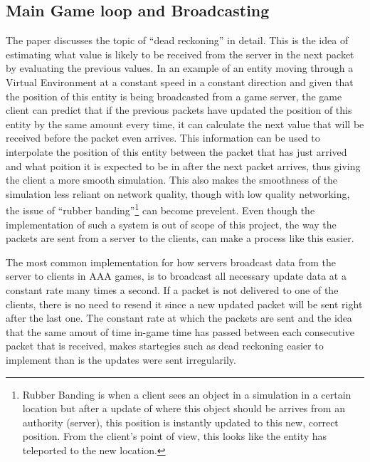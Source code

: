 \subsection{Main Game loop and Broadcasting}
The paper  discusses the topic of ``dead reckoning'' in detail. This is the idea of estimating what value is likely to be received from the server in the next packet by evaluating the previous values. In an example of an entity moving through a Virtual Environment at a constant speed in a constant direction and given that the position of this entity is being broadcasted from a game server, the game client can predict that if the previous packets have updated the position of this entity by the same amount every time, it can calculate the next value that will be received before the packet even arrives. This information can be used to interpolate the position of this entity between the packet that has just arrived and what poition it is expected to be in after the next packet arrives, thus giving the client a more smooth simulation. This also makes the smoothness of the simulation less reliant on network quality, though with low quality networking, the issue of ``rubber banding''\footnote{Rubber Banding is when a client sees an object in a simulation in a certain location but after a update of where this object should be arrives from an authority (server), this position is instantly updated to this new, correct position. From the client's point of view, this looks like the entity has teleported to the new location.} can become prevelent. Even though the implementation of such a system is out of scope of this project, the way the packets are sent from a server to the clients, can make a process like this easier.

The most common implementation for how servers broadcast data from the server to clients in AAA games, is to broadcast all necessary update data at a constant rate many times a second. If a packet is not delivered to one of the clients, there is no need to resend it since a new updated packet will be sent right after the last one. The constant rate at which the packets are sent and the idea that the same amout of time in-game time has passed between each consecutive packet that is received, makes startegies such as dead reckoning easier to implement than is the updates were sent irregularily.

